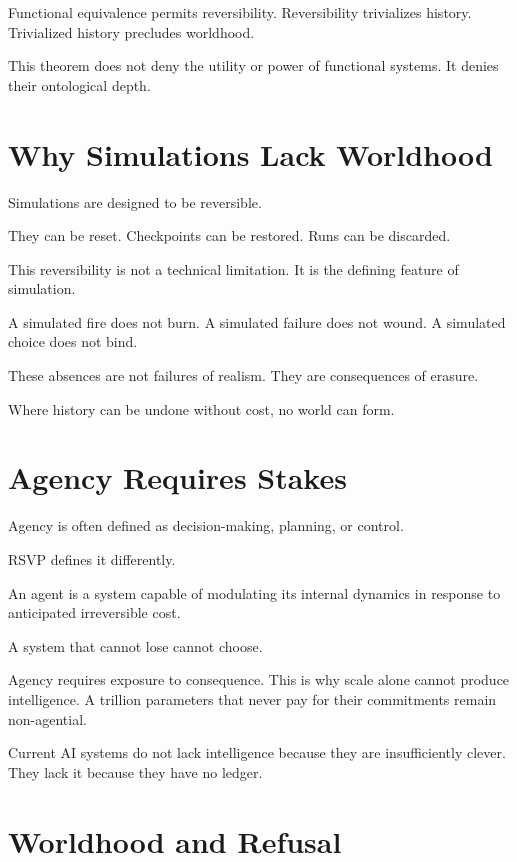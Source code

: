 \documentclass[11pt]{book}
\begin{document}
Functional equivalence permits reversibility. Reversibility trivializes history.
Trivialized history precludes worldhood.

This theorem does not deny the utility or power of functional systems. It denies
their ontological depth.

\section{Why Simulations Lack Worldhood}

Simulations are designed to be reversible.

They can be reset.
Checkpoints can be restored.
Runs can be discarded.

This reversibility is not a technical limitation. It is the defining feature of
simulation.

A simulated fire does not burn.
A simulated failure does not wound.
A simulated choice does not bind.

These absences are not failures of realism. They are consequences of erasure.

Where history can be undone without cost, no world can form.

\section{Agency Requires Stakes}

Agency is often defined as decision-making, planning, or control.

RSVP defines it differently.

\begin{definition}[Agency]
An agent is a system capable of modulating its internal dynamics in response to
anticipated irreversible cost.
\end{definition}

A system that cannot lose cannot choose.

Agency requires exposure to consequence. This is why scale alone cannot produce
intelligence. A trillion parameters that never pay for their commitments remain
non-agential.

Current AI systems do not lack intelligence because they are insufficiently
clever. They lack it because they have no ledger.

\section{Worldhood and Refusal}
\end{document}
